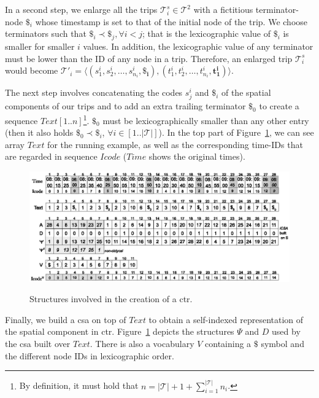 	In a second step, we enlarge all the trips $\mathcal{T}^s_i \in \mathcal{T}^2$ with a fictitious terminator-node $\$_i$ whose
	timestamp is set to that of the initial node of the trip. We choose terminators such that $\$_i \prec \$_j, \forall i<j$; 
	that is the lexicographic value of $\$_i$ is smaller for smaller $i$ values. In addition, the lexicographic value
	of any terminator must be lower than the ID of any node in a trip. Therefore, an enlarged trip $\mathcal{T}^s_i$
	would become $\mathcal{T}'_i =  \langle (s^i_1, s^i_2, \dots,  s^i_{n_i}, 
	\mathbf{\$_i}),(t^i_1, t^i_2, \dots,  t^i_{n_i}, \mathbf{t^i_1}) \rangle$. 

	The next step involves concatenating the codes $s^i_j$ and $\$_i$ of the spatial components of our trips and to add an 
	extra trailing terminator $\$_0$ to create a sequence $Text[1..n]$\footnote{By definition, it must hold that $n = |\mathcal{T}| + 1 + \displaystyle\sum^{|\mathcal{T}|}_{i=1} n_i$.}. $\$_0$ must be  lexicographically 
	smaller than any other entry (then it also holds $\$_0 \prec \$_i$, $\forall i \in [1..|\mathcal{T}|]$). In the top part of
	Figure~\ref{fig:tcsa}, we can see array $Text$ for the running example, as well as the corresponding time-IDs that
	are regarded in sequence $Icode$  ($Time$ shows the original times).
	
	\begin{figure}[ht]
	  \begin{center}
	  {\includegraphics[width=1.00\textwidth]{figures/csttr.eps}}
	  \end{center}
	  \caption{Structures involved in the creation of a \acrshort{ctr}.}
	  \label{fig:tcsa}
	\end{figure}

	Finally, we build a \gls{csa} on top of $Text$ to obtain a self-indexed representation of the spatial component in \gls{ctr}.
	Figure~\ref{fig:tcsa} depicts the structures $\Psi$ and $D$ used by the \gls{csa} built over $Text$. There is also a vocabulary
	$V$ containing a $\$$ symbol and the different node IDs in lexicographic order.

